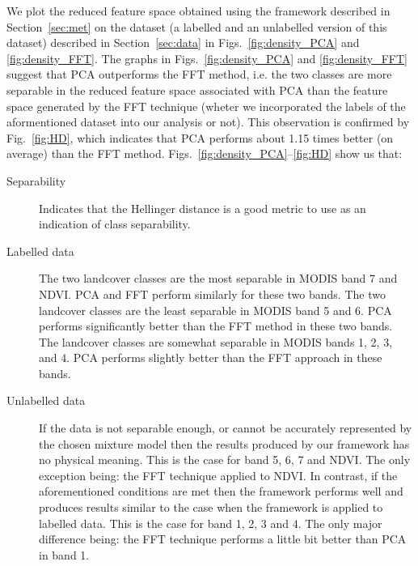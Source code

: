 \documentclass{article}
\begin{document}
We plot the reduced feature space obtained using the framework described in Section~\ref{sec:met} on the dataset (a labelled and an unlabelled version of this dataset) described in Section~\ref{sec:data} in Figs.~\ref{fig:density_PCA} and \ref{fig:density_FFT}. The graphs in Figs.~\ref{fig:density_PCA} and \ref{fig:density_FFT} suggest that PCA outperforms the FFT method, i.e. the two 
classes are more separable in the reduced feature space associated with PCA than the feature space generated by the FFT technique (wheter we incorporated the labels of the aformentioned dataset into our analysis or not). This observation is confirmed 
by Fig.~\ref{fig:HD}, which indicates that PCA performs about 1.15 times better (on average) than the FFT method. Figs.~\ref{fig:density_PCA}--\ref{fig:HD} show us that:
\begin{description}
 \item[Separability] Indicates that the Hellinger distance is a good metric to use as an indication of class separability.
 \item[Labelled data] The two landcover classes are the most separable in MODIS band 7 and NDVI. PCA and FFT perform similarly for these two bands. The two landcover classes are the least separable in MODIS band 5 and 6. PCA performs significantly better than the FFT method in these two bands.
 The landcover classes are somewhat separable in MODIS bands 1, 2, 3, and 4. PCA performs slightly better than the FFT approach in these bands. 
 \item[Unlabelled data]  
 If the data is not separable enough, or cannot be accurately represented by the chosen mixture model then the results produced by our framework has no physical meaning. This is the case for band 5, 6, 7 and NDVI. The only 
 exception being: the FFT technique applied to NDVI. In contrast, if the aforementioned conditions are met then the framework performs well and produces results similar to the case when the framework is applied to labelled data. This is the case for band
 1, 2, 3 and 4. The only major difference being: the FFT technique performs a little bit better than PCA in band 1.
\end{description}
\end{document}
